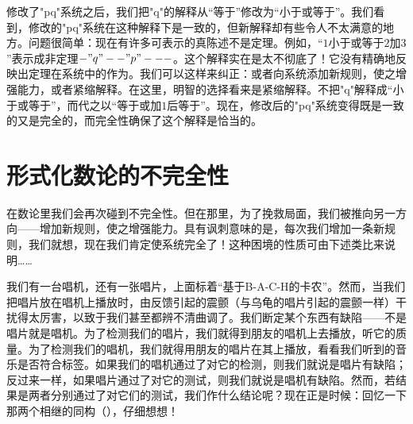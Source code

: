 修改了"pq"系统之后，我们把"q"的解释从“等于”修改为“小于或等于”。我们看到，修改的"pq"系统在这种解释下是一致的，但新解释却有些令人不太满意的地方。问题很简单：现在有许多可表示的真陈述不是定理。例如，“$1$小于或等于$2$加$3$”表示成非定理$-"q"--"p"---$。这个解释实在是太不彻底了！它没有精确地反映出定理在系统中的作为。我们可以这样来纠正：或者向系统添加新规则，使之增强能力，或者紧缩解释。在这里，明智的选择看来是紧缩解释。不把"q"解释成“小于或等于”，而代之以“等于或加$1$后等于”。现在，修改后的"pq"系统变得既是一致的又是完全的，而完全性确保了这个解释是恰当的。

\section{形式化数论的不完全性}

在数论里我们会再次碰到不完全性。但在那里，为了挽救局面，我们被推向另一方向——增加新规则，使之增强能力。具有讽刺意味的是，每次我们增加一条新规则，我们就想，现在我们肯定使系统完全了！这种困境的性质可由下述类比来说明……

我们有一台唱机，还有一张唱片，上面标着“基于B-A-C-H的卡农”。然而，当我们把唱片放在唱机上播放时，由反馈引起的震颤（与乌龟的唱片引起的震颤一样）干扰得太厉害，以致于我们甚至都辨不清曲调了。我们断定某个东西有缺陷——不是唱片就是唱机。为了检测我们的唱片，我们就得到朋友的唱机上去播放，听它的质量。为了检测我们的唱机，我们就得用朋友的唱片在其上播放，看看我们听到的音乐是否符合标签。如果我们的唱机通过了对它的检测，则我们就说是唱片有缺陷；反过来一样，如果唱片通过了对它的测试，则我们就说是唱机有缺陷。然而，若结果是两者分别通过了对它们的测试，我们作什么结论呢？现在正是时候：回忆一下那两个相继的同构（），仔细想想！
